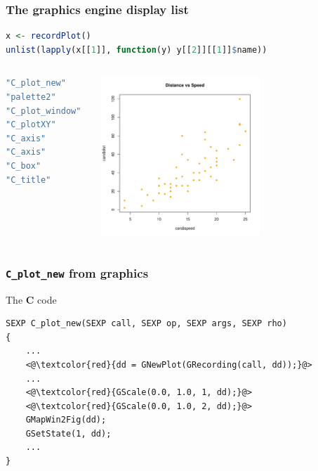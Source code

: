\documentclass{beamer}
\begin{document}
\begin{frame}[fragile]
\frametitle{The graphics engine display list}


\begin{lstlisting}[language = R]
x <- recordPlot()
unlist(lapply(x[[1]], function(y) y[[2]][[1]]$name))
\end{lstlisting}

\begin{columns}[c]
\begin{lstlisting}[language = R]
"C_plot_new"    
"palette2"      
"C_plot_window" 
"C_plotXY"      
"C_axis"        
"C_axis"       
"C_box"         
"C_title"    
\end{lstlisting}


\includegraphics[height = 6cm, width = 6cm]{plot/intro_1.pdf}

\end{columns}

\end{frame}




\begin{frame}[fragile]
\frametitle{\texttt{C\_plot\_new} from \textbf{graphics}}

\begin{block}{The \textbf{C} code}
\begin{lstlisting}
SEXP C_plot_new(SEXP call, SEXP op, SEXP args, SEXP rho)
{
    ...
    <@\textcolor{red}{dd = GNewPlot(GRecording(call, dd));}@>
    ...
    <@\textcolor{red}{GScale(0.0, 1.0, 1, dd);}@>
    <@\textcolor{red}{GScale(0.0, 1.0, 2, dd);}@>
    GMapWin2Fig(dd);
    GSetState(1, dd);
    ...
}
\end{lstlisting}
\end{block}

\end{frame}
\end{document}
